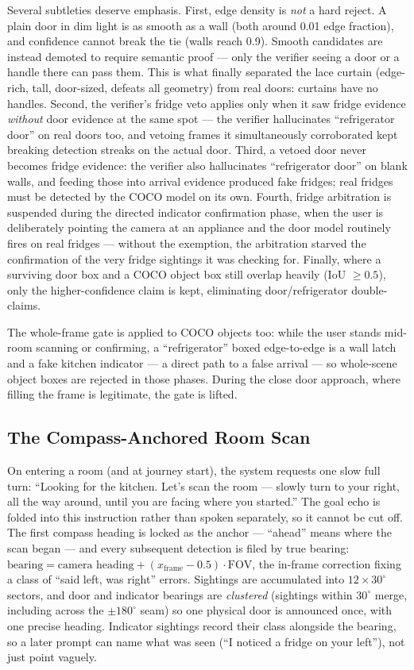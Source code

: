 Several subtleties deserve emphasis. First, edge density is \emph{not} a hard
reject. A plain door in dim light is as smooth as a wall (both around 0.01 edge
fraction), and confidence cannot break the tie (walls reach 0.9). Smooth candidates
are instead demoted to require semantic proof --- only the verifier seeing a door
or a handle there can pass them. This is what finally separated the lace curtain
(edge-rich, tall, door-sized, defeats all geometry) from real doors: curtains have
no handles. Second, the verifier's fridge veto applies only when it saw fridge
evidence \emph{without} door evidence at the same spot --- the verifier
hallucinates ``refrigerator door'' on real doors too, and vetoing frames it
simultaneously corroborated kept breaking detection streaks on the actual door.
Third, a vetoed door never becomes fridge evidence: the verifier also hallucinates
``refrigerator door'' on blank walls, and feeding those into arrival evidence
produced fake fridges; real fridges must be detected by the COCO model on its own.
Fourth, fridge arbitration is suspended during the directed indicator confirmation
phase, when the user is deliberately pointing the camera at an appliance and the
door model routinely fires on real fridges --- without the exemption, the
arbitration starved the confirmation of the very fridge sightings it was checking
for. Finally, where a surviving door box and a COCO object box still overlap
heavily (IoU $\geq 0.5$), only the higher-confidence claim is kept, eliminating
door/refrigerator double-claims.

The whole-frame gate is applied to COCO objects too: while the user stands
mid-room scanning or confirming, a ``refrigerator'' boxed edge-to-edge is a wall
latch and a fake kitchen indicator --- a direct path to a false arrival --- so
whole-scene object boxes are rejected in those phases. During the close door
approach, where filling the frame is legitimate, the gate is lifted.

\subsection{The Compass-Anchored Room Scan}
\label{sec:room_scan}

On entering a room (and at journey start), the system requests one slow full turn:
``Looking for the kitchen. Let's scan the room --- slowly turn to your right, all
the way around, until you are facing where you started.'' The goal echo is folded
into this instruction rather than spoken separately, so it cannot be cut off. The
first compass heading is locked as the anchor --- ``ahead'' means where the scan
began --- and every subsequent detection is filed by true bearing:
$\text{bearing} = \text{camera heading} + (x_{\text{frame}} - 0.5)\cdot
\text{FOV}$, the in-frame correction fixing a class of ``said left, was right''
errors. Sightings are accumulated into $12 \times 30^\circ$ sectors, and door and
indicator bearings are \emph{clustered} (sightings within $30^\circ$ merge,
including across the $\pm180^\circ$ seam) so one physical door is announced once,
with one precise heading. Indicator sightings record their class alongside the
bearing, so a later prompt can name what was seen (``I noticed a fridge on your
left''), not just point vaguely.

